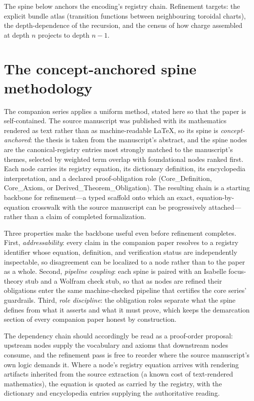 \documentclass[11pt]{article}
\theoremstyle{remark}
\begin{document}
The spine below anchors the encoding's registry chain. Refinement targets: the explicit bundle atlas (transition functions between neighbouring toroidal charts), the depth-dependence of the recursion, and the census of how charge assembled at depth $n$ projects to depth $n-1$.

\section{The concept-anchored spine methodology}
\label{sec:method}

The companion series applies a uniform method, stated here so that the paper is self-contained. The source manuscript was published with its mathematics rendered as text rather than as machine-readable LaTeX, so its spine is \emph{concept-anchored}: the thesis is taken from the manuscript's abstract, and the spine nodes are the canonical-registry entries most strongly matched to the manuscript's themes, selected by weighted term overlap with foundational nodes ranked first. Each node carries its registry equation, its dictionary definition, its encyclopedia interpretation, and a declared proof-obligation role (Core\_Definition, Core\_Axiom, or Derived\_Theorem\_Obligation). The resulting chain is a starting backbone for refinement---a typed scaffold onto which an exact, equation-by-equation crosswalk with the source manuscript can be progressively attached---rather than a claim of completed formalization.

Three properties make the backbone useful even before refinement completes. First, \emph{addressability}: every claim in the companion paper resolves to a registry identifier whose equation, definition, and verification status are independently inspectable, so disagreement can be localized to a node rather than to the paper as a whole. Second, \emph{pipeline coupling}: each spine is paired with an Isabelle focus-theory stub and a Wolfram check stub, so that as nodes are refined their obligations enter the same machine-checked pipeline that certifies the core series' guardrails. Third, \emph{role discipline}: the obligation roles separate what the spine defines from what it asserts and what it must prove, which keeps the demarcation section of every companion paper honest by construction.

The dependency chain should accordingly be read as a proof-order proposal: upstream nodes supply the vocabulary and axioms that downstream nodes consume, and the refinement pass is free to reorder where the source manuscript's own logic demands it. Where a node's registry equation arrives with rendering artifacts inherited from the source extraction (a known cost of text-rendered mathematics), the equation is quoted as carried by the registry, with the dictionary and encyclopedia entries supplying the authoritative reading.
\end{document}
